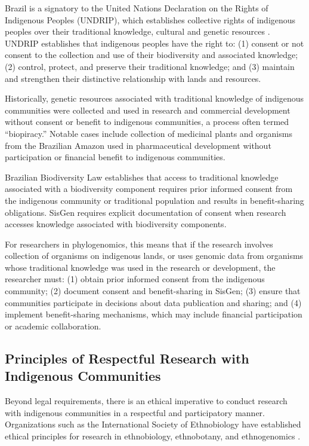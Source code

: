 Brazil is a signatory to the United Nations Declaration on the Rights of Indigenous Peoples (UNDRIP), which establishes collective rights of indigenous peoples over their traditional knowledge, cultural and genetic resources \parencite{undrip2007}. UNDRIP establishes that indigenous peoples have the right to: (1) consent or not consent to the collection and use of their biodiversity and associated knowledge; (2) control, protect, and preserve their traditional knowledge; and (3) maintain and strengthen their distinctive relationship with lands and resources.

Historically, genetic resources associated with traditional knowledge of indigenous communities were collected and used in research and commercial development without consent or benefit to indigenous communities, a process often termed ``biopiracy.'' Notable cases include collection of medicinal plants and organisms from the Brazilian Amazon used in pharmaceutical development without participation or financial benefit to indigenous communities.

Brazilian Biodiversity Law establishes that access to traditional knowledge associated with a biodiversity component requires prior informed consent from the indigenous community or traditional population and results in benefit-sharing obligations. SisGen requires explicit documentation of consent when research accesses knowledge associated with biodiversity components.

For researchers in phylogenomics, this means that if the research involves collection of organisms on indigenous lands, or uses genomic data from organisms whose traditional knowledge was used in the research or development, the researcher must: (1) obtain prior informed consent from the indigenous community; (2) document consent and benefit-sharing in SisGen; (3) ensure that communities participate in decisions about data publication and sharing; and (4) implement benefit-sharing mechanisms, which may include financial participation or academic collaboration.

\subsection{Principles of Respectful Research with Indigenous Communities}

Beyond legal requirements, there is an ethical imperative to conduct research with indigenous communities in a respectful and participatory manner. Organizations such as the International Society of Ethnobiology have established ethical principles for research in ethnobiology, ethnobotany, and ethnogenomics \parencite{ise2006}.

